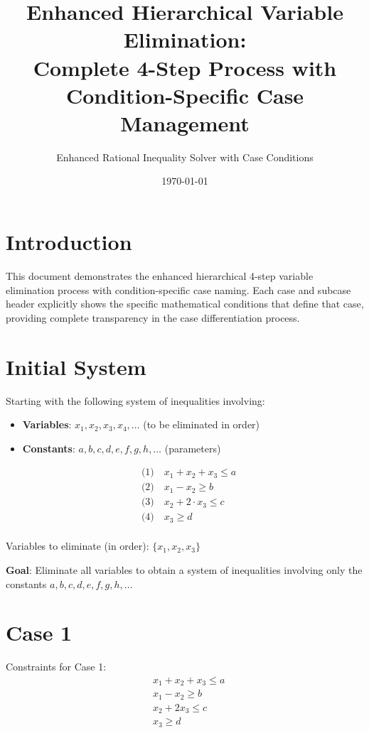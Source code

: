 \documentclass{article}
\title{Enhanced Hierarchical Variable Elimination: \\
Complete 4-Step Process with Condition-Specific Case Management}
\author{Enhanced Rational Inequality Solver with Case Conditions}
\date{\today}
\begin{document}
\maketitle

\section{Introduction}

This document demonstrates the enhanced hierarchical 4-step variable elimination process
with condition-specific case naming. Each case and subcase header explicitly shows the
specific mathematical conditions that define that case, providing complete transparency
in the case differentiation process.

\section{Initial System}

Starting with the following system of inequalities involving:
\begin{itemize}
\item \textbf{Variables}: $x_1, x_2, x_3, x_4, \ldots$ (to be eliminated in order)
\item \textbf{Constants}: $a, b, c, d, e, f, g, h, \ldots$ (parameters)
\end{itemize}

\begin{align}
& \text{(1)} \quad x_{1} + x_{2} + x_{3} \leq a \\
& \text{(2)} \quad x_{1} - x_{2} \geq b \\
& \text{(3)} \quad x_{2} + 2 \cdot x_{3} \leq c \\
& \text{(4)} \quad x_{3} \geq d \\
\end{align}

Variables to eliminate (in order): $\{x_{1}, x_{2}, x_{3}\}$

\textbf{Goal}: Eliminate all variables to obtain a system of inequalities
involving only the constants $a, b, c, d, e, f, g, h, \ldots$

\section{Case 1}

Constraints for Case 1:
\begin{align}
& x_{1} + x_{2} + x_{3} \leq a \\
& x_{1} - x_{2} \geq b \\
& x_{2} + 2 x_{3} \leq c \\
& x_{3} \geq d \\
\end{align}
\end{document}
